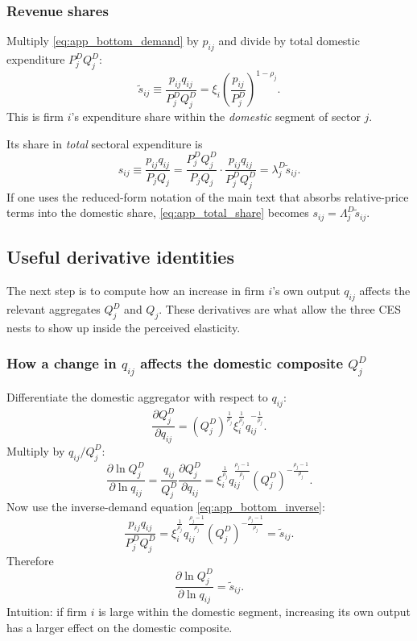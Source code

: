 \subsubsection{Revenue shares}

Multiply \eqref{eq:app_bottom_demand} by $p_{ij}$ and divide by total domestic expenditure $P_j^D Q_j^D$:
\begin{equation}
\tilde{s}_{ij}
\equiv
\frac{p_{ij} q_{ij}}{P_j^D Q_j^D}
=
\xi_i \left( \frac{p_{ij}}{P_j^D} \right)^{1-\rho_j}.
\label{eq:app_within_share}
\end{equation}
This is firm $i$'s expenditure share within the \emph{domestic} segment of sector $j$.

Its share in \emph{total} sectoral expenditure is
\begin{equation}
s_{ij}
\equiv
\frac{p_{ij} q_{ij}}{P_j Q_j}
=
\frac{P_j^D Q_j^D}{P_j Q_j}
\cdot
\frac{p_{ij} q_{ij}}{P_j^D Q_j^D}
=
\lambda_j^D \tilde{s}_{ij}.
\label{eq:app_total_share}
\end{equation}
If one uses the reduced-form notation of the main text that absorbs relative-price terms into the domestic share, \eqref{eq:app_total_share} becomes $s_{ij} = \Lambda_j^D \tilde{s}_{ij}$.

\subsection{Useful derivative identities}

The next step is to compute how an increase in firm $i$'s own output $q_{ij}$ affects the relevant aggregates $Q_j^D$ and $Q_j$. These derivatives are what allow the three CES nests to show up inside the perceived elasticity.

\subsubsection{How a change in $q_{ij}$ affects the domestic composite $Q_j^D$}

Differentiate the domestic aggregator with respect to $q_{ij}$:
\[
\frac{\partial Q_j^D}{\partial q_{ij}}
=
(Q_j^D)^{\frac{1}{\rho_j}}
\xi_i^{\frac{1}{\rho_j}}
q_{ij}^{-\frac{1}{\rho_j}}.
\]
Multiply by $q_{ij}/Q_j^D$:
\[
\frac{\partial \ln Q_j^D}{\partial \ln q_{ij}}
=
\frac{q_{ij}}{Q_j^D}
\frac{\partial Q_j^D}{\partial q_{ij}}
=
\xi_i^{\frac{1}{\rho_j}} q_{ij}^{\frac{\rho_j-1}{\rho_j}} (Q_j^D)^{-\frac{\rho_j-1}{\rho_j}}.
\]
Now use the inverse-demand equation \eqref{eq:app_bottom_inverse}:
\[
\frac{p_{ij} q_{ij}}{P_j^D Q_j^D}
=
\xi_i^{\frac{1}{\rho_j}} q_{ij}^{\frac{\rho_j-1}{\rho_j}} (Q_j^D)^{-\frac{\rho_j-1}{\rho_j}}
=
\tilde{s}_{ij}.
\]
Therefore
\begin{equation}
\frac{\partial \ln Q_j^D}{\partial \ln q_{ij}} = \tilde{s}_{ij}.
\label{eq:app_dlogQD_dlogq}
\end{equation}
Intuition: if firm $i$ is large within the domestic segment, increasing its own output has a larger effect on the domestic composite.

